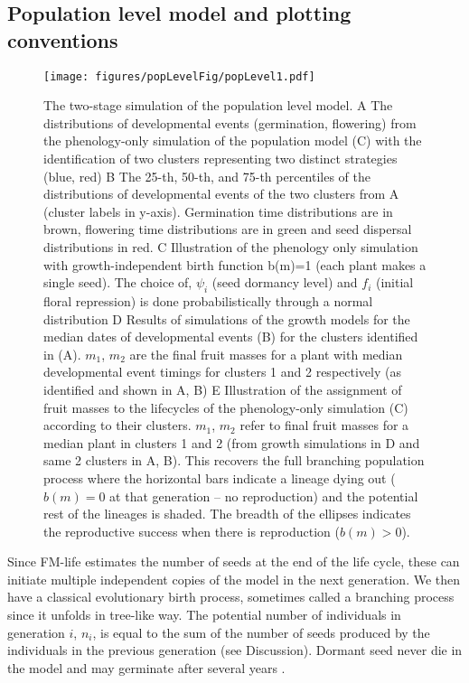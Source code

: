 \subsection{Population level model and plotting conventions}
\label{population-level-model-and-plotting-conventions}

\begin{figure}[p]
\centering
\texttt{[image: figures/popLevelFig/popLevel1.pdf]}
\caption{The two-stage simulation of the population level model. A The
  distributions of developmental events (germination, flowering) from the
  phenology-only simulation of the population model (C) with the identification
  of two clusters representing two distinct strategies (blue, red) B The 25-th,
  50-th, and 75-th percentiles of the distributions of developmental events of
  the two clusters from A (cluster labels in y-axis). Germination time
  distributions are in brown, flowering time distributions are in green and seed
  dispersal distributions in red. C Illustration of the phenology only simulation
  with growth-independent birth function b(m)=1 (each plant makes a single
  seed). The choice of, $\psi_i$ (seed dormancy level) and $f_i$ (initial floral
  repression) is done probabilistically through a normal distribution D Results
  of simulations of the growth models for the median dates of developmental
  events (B) for the clusters identified in (A). $m_1$, $m_2$ are the final
  fruit masses for a plant with median developmental event timings for clusters
  1 and 2 respectively (as identified and shown in A, B) E Illustration of the
  assignment of fruit masses to the lifecycles of the phenology-only simulation
  (C) according to their clusters. $m_1$, $m_2$ refer to final fruit masses for
  a median plant in clusters 1 and 2 (from growth simulations in D and same 2
  clusters in A, B). This recovers the full branching population process where
  the horizontal bars indicate a lineage dying out ($b(m)=0$ at that generation
  -- no reproduction) and the potential rest of the lineages is shaded. The
  breadth of the ellipses indicates the reproductive success when there is
  reproduction ($b(m) > 0$).}
\label{fig:popModel}
\end{figure}

Since FM-life estimates the number of seeds at the end of the life cycle, these
can initiate multiple independent copies of the model in the next generation. We
then have a classical evolutionary birth process, sometimes called a branching
process since it unfolds in tree-like way. The potential number of individuals
in generation \(i\), \(n_{i}\), is equal to the sum of the number of seeds
produced by the individuals in the previous generation (see Discussion). Dormant
seed never die in the model and may germinate after several years
\citep{burghardt_modeling_2015}.

